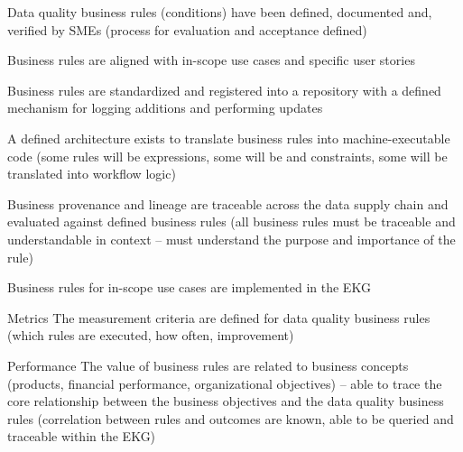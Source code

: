 \kgmmscoringsection

\kgmmscoringlevelOne

\begin{scoring}

  \item Data quality business rules (conditions) have been defined, documented and, verified by SMEs (process for
        evaluation and acceptance defined)
  \item Business rules are aligned with in-scope use cases and specific user stories
  \item Business rules are standardized and registered into a repository with a defined mechanism for logging
        additions and performing updates

\end{scoring}

\kgmmscoringlevelTwo

\begin{scoring}

  \item A defined architecture exists to translate business rules into machine-executable code (some rules will be
         expressions, some will be  and constraints, some will be translated into
        workflow logic)
  \item Business provenance and lineage are traceable across the
        data supply chain and evaluated against defined business rules (all business rules
        must be traceable and understandable in context -- must understand the purpose and importance of the rule)
  \item Business rules for in-scope use cases are implemented in the EKG

\end{scoring}

\kgmmscoringlevelThree

\begin{scoring}

    \item [Metrics] The measurement criteria are defined for data quality business rules (which rules are executed,
          how often, improvement)
    \item [Performance] The value of business rules are related to business concepts (products, financial performance,
          organizational objectives) -- able to trace the core relationship between the business objectives and
          the data quality business rules (correlation between rules and outcomes are known, able to be queried and
          traceable within the EKG)

\end{scoring}

